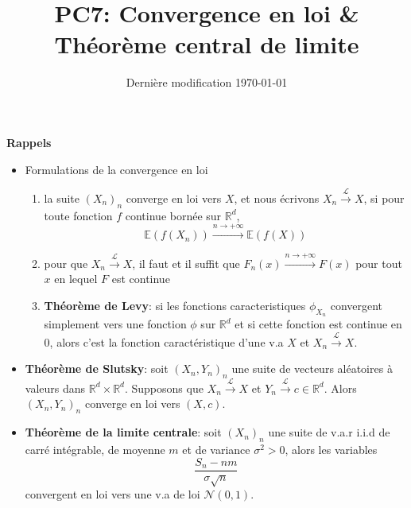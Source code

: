 \documentclass[french]{article}
\begin{document}
	\title{PC7: Convergence en loi \& Théorème central de limite}
	\date{Dernière modification \today}
	
	\maketitle
	
	\begin{tcolorbox}[colback=red!5!white,colframe=red!75!black]
		\textbf{\large{Rappels}}
		\begin{itemize}
			\item Formulations de la convergence en loi
			\begin{enumerate}
				\item la suite $(X_n)_n$ converge en loi vers $X$, et nous écrivons $X_n \xrightarrow{\mathcal{L}} X$, si pour toute fonction $f$ continue bornée sur $\mathbb{R}^d$,
				\[\mathbb{E}(f(X_n)) \xrightarrow{n \to +\infty} \mathbb{E}(f(X))\]
				\item pour que $X_n \xrightarrow{\mathcal{L}} X$, il faut et il suffit que $F_n(x) \xrightarrow{n \to +\infty} F(x)$ pour tout $x$ en lequel $F$ est continue
				\item \textbf{Théorème de Levy}: si les fonctions caracteristiques $\phi_{X_n}$ convergent simplement vers une fonction $\phi$ sur $\mathbb{R}^d$ et si cette fonction est continue en 0, alors c'est la fonction caractéristique d'une v.a $X$ et $X_n \xrightarrow{\mathcal{L}} X$.
			\end{enumerate}
			\item \textbf{Théorème de Slutsky}: soit $(X_n, Y_n)_n$ une suite de vecteurs aléatoires à valeurs dans $\mathbb{R}^d \times \mathbb{R}^d$. Supposons que $X_n \xrightarrow{\mathcal{L}} X$ et $Y_n \xrightarrow{\mathcal{L}} c \in \mathbb{R}^d$. Alors $(X_n, Y_n)_n$ converge en loi vers $(X,c)$.
			\item \textbf{Théorème de la limite centrale}: soit $(X_n)_n$ une suite de v.a.r i.i.d de carré intégrable, de moyenne $m$ et de variance $\sigma^2 > 0$, alors les variables
			\[\frac{S_n - nm}{\sigma \sqrt{n}}\]
			convergent en loi vers une v.a de loi $\mathcal{N}(0,1)$.
		\end{itemize}
	\end{tcolorbox}

	\newpage
	
\end{document}
